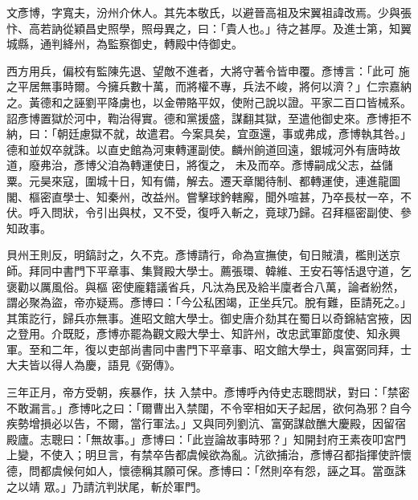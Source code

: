 \begin{pinyinscope}
 文彥博，字寬夫，汾州介休人。其先本敬氏，以避晉高祖及宋翼祖諱改焉。少與張忭、高若訥從穎昌史照學，照母異之，曰：「貴人也。」待之甚厚。及進士第，知翼城縣，通判絳州，為監察御史，轉殿中侍御史。



 西方用兵，偏校有監陳先退、望敵不進者，大將守著令皆申覆。彥博言：「此可
 施之平居無事時爾。今擁兵數十萬，而將權不專，兵法不峻，將何以濟？」仁宗嘉納之。黃德和之誣劉平降虜也，以金帶賂平奴，使附己說以證。平家二百口皆械系。詔彥博置獄於河中，鞫治得實。德和黨援盛，謀翻其獄，至遣他御史來。彥博拒不納，曰：「朝廷慮獄不就，故遣君。今案具矣，宜亟還，事或弗成，彥博執其咎。」德和並奴卒就誅。以直史館為河東轉運副使。麟州餉道回遠，銀城河外有唐時故道，廢弗治，彥博父洎為轉運使日，將復之，
 未及而卒。彥博嗣成父志，益儲粟。元昊來寇，圍城十日，知有備，解去。遷天章閣待制、都轉運使，連進龍圖閣、樞密直學士、知秦州，改益州。嘗擊球鈐轄廨，聞外喧甚，乃卒長杖一卒，不伏。呼入問狀，令引出與杖，又不受，復呼入斬之，竟球乃歸。召拜樞密副使、參知政事。



 貝州王則反，明鎬討之，久不克。彥博請行，命為宣撫使，旬日賊潰，檻則送京師。拜同中書門下平章事、集賢殿大學士。薦張環、韓維、王安石等恬退守道，乞褒勸以厲風俗。與樞
 密使龐籍議省兵，凡汰為民及給半廩者合八萬，論者紛然，謂必聚為盜，帝亦疑焉。彥博曰：「今公私困竭，正坐兵冗。脫有難，臣請死之。」其策訖行，歸兵亦無事。進昭文館大學士。御史唐介劾其在蜀日以奇錦結宮掖，因之登用。介既貶，彥博亦罷為觀文殿大學士、知許州，改忠武軍節度使、知永興軍。至和二年，復以吏部尚書同中書門下平章事、昭文館大學士，與富弼同拜，士大夫皆以得人為慶，語見《弼傳》。



 三年正月，帝方受朝，疾暴作，扶
 入禁中。彥博呼內侍史志聰問狀，對曰：「禁密不敢漏言。」彥博叱之曰：「爾曹出入禁闥，不令宰相如天子起居，欲何為邪？自今疾勢增損必以告，不爾，當行軍法。」又與同列劉沆、富弼謀啟醮大慶殿，因留宿殿廬。志聰曰：「無故事。」彥博曰：「此豈論故事時邪？」知開封府王素夜叩宮門上變，不使入；明旦言，有禁卒告都虞候欲為亂。沆欲捕治，彥博召都指揮使許懷德，問都虞候何如人，懷德稱其願可保。彥博曰：「然則卒有怨，誣之耳。當亟誅之以靖
 眾。」乃請沆判狀尾，斬於軍門。




\end{pinyinscope}

